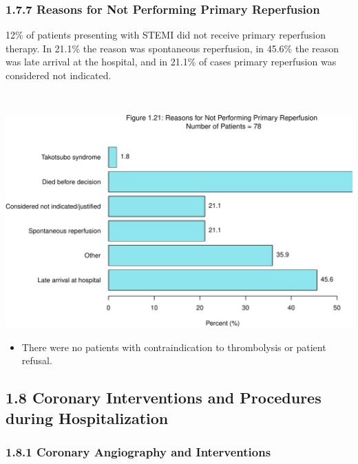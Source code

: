 \documentclass[
]{article}
\providecommand{\tightlist}{%
  \setlength{\itemsep}{0pt}\setlength{\parskip}{0pt}}
\begin{document}
\pagebreak

\subsubsection{1.7.7 Reasons for Not Performing Primary
Reperfusion}\label{reasons-for-not-performing-primary-reperfusion}

12\% of patients presenting with STEMI did not receive primary
reperfusion therapy. In 21.1\% the reason was spontaneous reperfusion,
in 45.6\% the reason was late arrival at the hospital, and in 21.1\% of
cases primary reperfusion was considered not indicated.

~

\includegraphics{ACSIS_2024_v1_pdf_files/figure-latex/unnamed-chunk-72-1.pdf}

\begin{itemize}
\tightlist
\item
  There were no patients with contraindication to thrombolysis or
  patient refusal.
\end{itemize}

\pagebreak

\subsection{1.8 Coronary Interventions and Procedures during
Hospitalization}\label{coronary-interventions-and-procedures-during-hospitalization}

\subsubsection{1.8.1 Coronary Angiography and
Interventions}\label{coronary-angiography-and-interventions}
\end{document}
